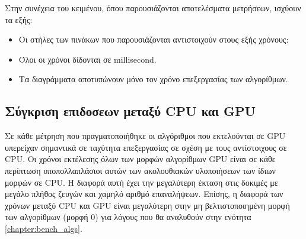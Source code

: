 Στην συνέχεια του κειμένου, όπου παρουσιάζονται αποτελέσματα μετρήσεων, ισχύουν τα εξής:
\begin{itemize}
\item Οι στήλες των πινάκων που παρουσιάζονται αντιστοιχούν στους εξής χρόνους:
\item Όλοι οι χρόνοι δίδονται σε millisecond. 
\item Τα διαγράμματα αποτυπώνουν μόνο τον χρόνο επεξεργασίας των αλγορίθμων.
\end{itemize}
\subsection{Σύγκριση επιδοσεων μεταξύ CPU και GPU}
\label{chapter:bench_cpugpu}
\noindent Σε κάθε μέτρηση που πραγματοποιήθηκε οι αλγόριθμοι που εκτελούνται σε GPU υπερείχαν σημαντικά σε ταχύτητα επεξεργασίας σε σχέση με τους αντίστοιχους σε CPU. Οι χρόνοι εκτέλεσης όλων των μορφών αλγορίθμων GPU είναι σε κάθε περίπτωση υποπολλαπλάσιοι αυτών των ακολουθιακών υλοποιήσεων των ίδιων μορφών σε CPU. Η διαφορά αυτή έχει την μεγαλύτερη έκταση στις δοκιμές με μεγάλο πλήθος ζευγών και χαμηλό αριθμό επαναλήψεων. Επίσης, η διαφορά των χρόνων μεταξύ CPU και GPU είναι μεγαλύτερη στην μη βελτιστοποιημένη μορφή των αλγορίθμων (μορφή 0) για λόγους που θα αναλυθούν στην ενότητα \ref{chapter:bench_algs}.


